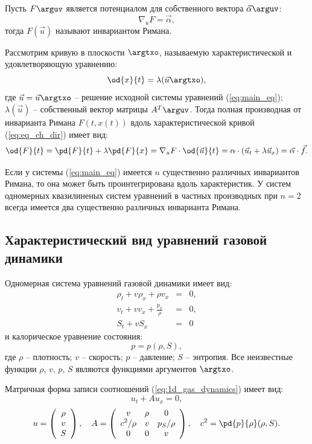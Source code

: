 \documentclass[a4paper, 14pt]{extarticle}
\begin{document}
\begin{dfn}
	Пусть $F\arguv$ является потенциалом для собственного вектора $\vec{\alpha}\arguv$:
	\[
	\nabla_{u} F = \vec{\alpha},
	\]
	тогда $F(\vec{u})$ называют \alert{инвариантом Римана}.
\end{dfn}


Рассмотрим кривую в плоскости $\argtxo$, называемую \alert{характеристической} и удовлетворяющую уравнению:
\begin{equation}
	\label{eq:eq_ch_dir}
	\od{x}{t} = \lambda(\vec{u}\argtxo),
\end{equation}
где $\vec{u} = \vec{u}\argtxo$ -- решение исходной системы уравнений (\ref{eq:main_eq}); $\lambda(\vec{u})$ -- собственный вектор матрицы $A^T\arguv$.
Тогда полная производная от инварианта Римана $F(t, x(t))$ вдоль характеристической кривой (\ref{eq:eq_ch_dir}) имеет вид:
\[
\od{F}{t} = \pd{F}{t} + \lambda \pd{F}{x} =  \nabla_{u} F \cdot \od{\vec{u}}{t} =  
\alpha \cdot( \vec{u}_t  + \lambda \vec{u}_x ) = \vec{\alpha} \cdot \vec{f}.
\]

Если у системы (\ref{eq:main_eq}) имеется $n$ существенно различных инвариантов Римана, то она может быть проинтегрирована вдоль характеристик. У систем одномерных квазилиненых систем уравнений в частных производных при $n=2$ всегда имеется два существенно различных инварианта Римана.

\subsection{Характеристический вид уравнений газовой динамики }

Одномерная система уравнений газовой динамики имеет вид:
\begin{eqnarray}
	\label{eq:1d_gas_dynamics}
\nonumber	\rho_t + v\rho_x + \rho v_x & = & 0,\\
	v_t + v v_x + \frac{p_x}{\rho} & = & 0,\\
\nonumber	S_t + v S_x & = & 0 
\end{eqnarray}
и калорическое уравнение состояния:
\[
p = p(\rho, S),
\]
где $\rho$ -- плотность; $v$ -- скорость; $p$ -- давление; $S$ -- энтропия. Все неизвестные функции $\rho$, $v$, $p$, $S$ являются функциями аргументов $\argtxo$.

Матричная форма записи соотношений (\ref{eq:1d_gas_dynamics}) имеет вид:
\[
	u_t + A u_x = 0,
\]
\[
	u = \left(
	\begin{array}{c}
		\rho\\ v\\ S
	\end{array}
	\right),\quad
	A = \left(
	\begin{array}{ccc}
		v & \rho & 0\\
		\displaystyle c^2/\rho & v & p_S/\rho\\
		0 & 0 & v\\
	\end{array}
	\right),\quad
	c^2 = \pd{p}{\rho}(\rho,S).
\]	
\end{document}
